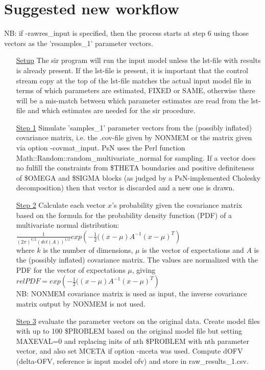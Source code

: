 \section{Suggested new workflow}
NB: if -rawres\_input is specified, then the process starts
at step 6 using those vectors as the 'resamples\_1' parameter vectors. 
\begin{itemize}
\item[\underline{Setup}] The sir program will run the input model unless the lst-file with results is already present. 
If the lst-file is present, it
is important that the control stream copy at the top of the lst-file matches the
actual input model file in terms of which parameters are estimated, 
FIXED or SAME, otherwise there will be a mis-match between which parameter estimates are read from the
lst-file and which estimates are needed for the sir procedure.
\item[\underline{Step 1}] Simulate 'samples\_1' parameter vectors from the 
(possibly inflated)
covariance matrix, i.e. the .cov-file given by NONMEM 
or the matrix given via option -covmat\_input. PsN uses the Perl function\\ 
Math::Random::random\_multivariate\_normal
for sampling. If a vector does no fulfill the constraints from \$THETA boundaries
and positive definiteness of \$OMEGA and
\$SIGMA blocks (as judged by a PsN-implemented Cholesky decomposition) 
then that vector is 
discarded and a new one is drawn.
\item[\underline{Step 2}] Calculate each vector $x$’s probability 
given the covariance matrix based on the formula for the probability 
density function (PDF) of a multivariate normal distribution:\\
\begin{math}
\frac{1}{\left(2\pi\right)^{k/2}\left(det\left(A\right)\right)^{1/2}} exp\left(-\frac{1}{2}(\left(x-\mu\right)A^{-1} \left(x-\mu\right)^T\right)
\end{math}
\\
where $k$ is the number of dimensions, 
$\mu$ is the vector of expectations and $A$ is the (possibly inflated) covariance matrix.
The values are normalized with the PDF for the vector of expectations $\mu$, giving\\
\begin{math}
relPDF=exp\left(-\frac{1}{2}(\left(x-\mu\right)A^{-1} \left(x-\mu\right)^T\right)
\end{math}
\\
NB: NONMEM covariance matrix is used as input, the inverse covariance matrix
output by NONMEM is not used.
\item[\underline{Step 3}] evaluate the parameter vectors on the original data.
Create model files with up to 100 \$PROBLEM based on the original model file but setting MAXEVAL=0
and replacing inits of nth \$PROBLEM with nth parameter vector, and also set MCETA if option -mceta was used. Compute dOFV 
(delta-OFV, reference is input model ofv) and store in raw\_results\_1.csv.


\end{itemize}
